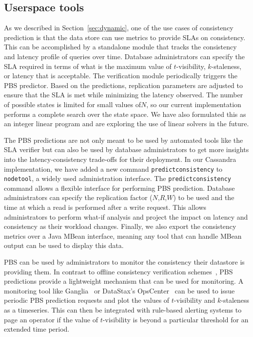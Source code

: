 \subsection{Userspace tools}


As we described in Section~\ref{sec:dynamic}, one of the use cases of
consistency prediction is that the data store can use metrics to
provide SLAs on consistency. This can be accomplished by a standalone
module that tracks the consistency and latency profile of queries over
time. Database administrators can specify the SLA required in terms of
what is the maximum value of $t$-visibility, $k$-staleness, or latency
that is acceptable. The verification module periodically triggers the
PBS predictor. Based on the predictions, replication parameters are
adjusted to ensure that the SLA is met while minimizing the latency
observed. The number of possible states is limited for small values
of$ N$, so our current implementation performs a complete search over
the state space.  We have also formulated this as an integer linear
program and are exploring the use of linear solvers in the future.

The PBS predictions are not only meant to be used by automated tools
like the SLA verifier but can also be used by database administrators
to get more insights into the latency-consistency trade-offs for their
deployment. In our Cassandra implementation, we have added a new
command \texttt{predictconsistency} to \texttt{nodetool}, a widely
used administration interface.  The \texttt{predictconsistency}
command allows a flexible interface for performing PBS
prediction. Database administrators can specify the replication factor
($N$,$R$,$W$) to be used and the time at which a read is performed
after a write request. This allows administrators to perform what-if
analysis and project the impact on latency and consistency as their
workload changes.  Finally, we also export the consistency metrics
over a Java MBean interface, meaning any tool that can handle MBean
output can be used to display this data.


PBS can be used by administrators to monitor the consistency their
datastore is providing them. In contrast to offline consistency
verification schemes~\cite{podc-hpl}, PBS predictions provide a
lightweight mechanism that can be used for monitoring. A monitoring
tool like Ganglia~\cite{massie2004ganglia} or DataStax's
OpsCenter~\cite{datastax-opscenter} can be used to issue periodic PBS
prediction requests and plot the values of $t$-visibility and
$k$-staleness as a timeseries. This can then be integrated with
rule-based alerting systems to page an operator if the value of
$t$-visibility is beyond a particular threshold for an extended time
period.


